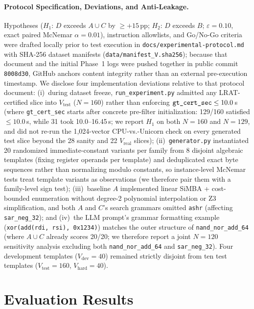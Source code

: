 \documentclass[11pt,a4paper]{article}
\begin{document}
\paragraph{Protocol Specification, Deviations, and Anti-Leakage.}
Hypotheses ($H_1$: $D$ exceeds $A \cup C$ by $\ge +15$\,pp; $H_2$: $D$ exceeds $B$; $\varepsilon = 0.10$, exact paired McNemar $\alpha = 0.01$), instruction allowlists, and Go/No-Go criteria were drafted locally prior to test execution in \texttt{docs/experimental-protocol.md} with SHA-256 dataset manifests (\texttt{data/manifest\_V.sha256}); because that document and the initial Phase~1 logs were pushed together in public commit \texttt{8008d30}, GitHub anchors content integrity rather than an external pre-execution timestamp. We disclose four implementation deviations relative to that protocol document:
(i)~during dataset freeze, \texttt{run\_experiment.py} admitted any LRAT-certified slice into $V_{\mathrm{test}}$ ($N=160$) rather than enforcing $\text{\texttt{gt\_cert\_sec}} \le 10.0$\,s (where \texttt{gt\_cert\_sec} starts after concrete pre-filter initialization: 129/160 satisfied $\le 10.0$\,s, while 31 took 10.0--16.45\,s; we report $H_1$ on both $N=160$ and $N=129$, and did not re-run the 1,024-vector CPU-vs.-Unicorn check on every generated test slice beyond the 28 sanity and 22 $V_{\mathrm{real}}$ slices);
(ii)~\texttt{generator.py} instantiated 20 randomized immediate-constant variants per family from 8 disjoint algebraic templates (fixing register operands per template) and deduplicated exact byte sequences rather than normalizing modulo constants, so instance-level McNemar tests treat template variants as observations (we therefore pair them with a family-level sign test);
(iii)~baseline $A$ implemented linear SiMBA + cost-bounded enumeration without degree-2 polynomial interpolation or Z3 simplification, and both $A$ and $C$'s search grammars omitted \texttt{ashr} (affecting \texttt{sar\_neg\_32}); and
(iv)~the LLM prompt's grammar formatting example (\texttt{xor(add(rdi, rsi), 0x1234)}) matches the outer structure of \texttt{nand\_nor\_add\_64} (where $A \cup C$ already scores 20/20; we therefore report a joint $N=120$ sensitivity analysis excluding both \texttt{nand\_nor\_add\_64} and \texttt{sar\_neg\_32}).
Four development templates ($V_{\mathrm{dev}}=40$) remained strictly disjoint from ten test templates ($V_{\mathrm{test}}=160$, $V_{\mathrm{hard}}=40$).

\section{Evaluation Results}
\end{document}
